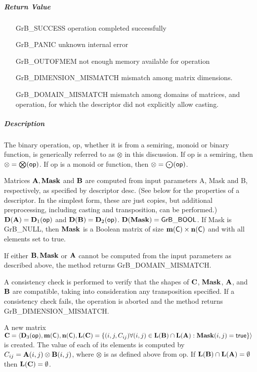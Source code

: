\subparagraph{Return Value}

\begin{itemize}[leftmargin=2.1in]
    \item[{\sf GrB\_SUCCESS}]             operation completed successfully
    \item[{\sf GrB\_PANIC}]               unknown internal error
    \item[{\sf GrB\_OUTOFMEM}]            not enough memory available for operation
    \item[{\sf GrB\_DIMENSION\_MISMATCH}] mismatch among matrix dimensions.
    \item[{\sf GrB\_DOMAIN\_MISMATCH}]    mismatch among domains of matrices, and operation, for which the descriptor did not explicitly allow casting.
\end{itemize}

\subparagraph{Description}

The binary operation, {\sf op}, whether it is from a semiring, monoid or binary function,
is generically referred to as $\otimes$ in this discussion.
If {\sf op} is a semiring, then $\otimes = \bigotimes({\sf op})$. 
If {\sf op} is a monoid or function, then $\otimes = \bigodot({\sf op})$.

Matrices ${\bf A}, {\bf Mask}$ and ${\bf B}$ are computed from
input parameters {\sf A}, {\sf Mask} and {\sf B}, respectively, as specified
by descriptor {\sf desc}. (See below for the properties of a descriptor. In
the simplest form, these are just copies, but additional preprocessing,
including casting and transposition, can be performed.)  $\bold{D}({\bf A}) =
\bold{D}_1({\sf op})$ and $\bold{D}({\bf B}) = \bold{D}_2({\sf op})$.
$\bold{D}({\bf Mask}) = {\sf GrB\_BOOL}$.  If {\sf Mask} is {\sf GrB\_NULL},
then ${\bf Mask}$ is a Boolean matrix of size $\bold{m}({\bf \sf C}) \times \bold{n}({\bf \sf C})$
and with all elements set to {\sf true}.

If either ${\bf B}, {\bf Mask}$ or ${\bf A}$ cannot be computed
from the input parameters as described above, the method returns {\sf
    GrB\_DOMAIN\_MISMATCH}.

A consistency check is performed to verify that the 
shapes of ${\bf C}$, ${\bf Mask}$, ${\bf A}$, and ${\bf B}$
are compatible, taking into consideration any transposition specified.
If a consistency
check fails, the operation is aborted and the method returns {\sf
    GrB\_DIMENSION\_MISMATCH}.

A new matrix ${\bf C} = \langle \bold{D}_3({\sf op}), \bold{m}({\bf \sf C}),
\bold{n}({\bf \sf C}), \bold{L}({\bf C}) = \{(i,j,C_{ij})  \forall (i,j) \in
\bold{L}({\bf B}) \cap \bold{L}({\bf A}) : {\bf Mask}(i,j)
= {\sf true} \} \rangle$ is created.  The value of each of its
elements is computed by $C_{ij} = {\bf A}(i,j) \otimes {\bf B}(i,j)$,
where $\otimes$ is as defined above from {\sf op}.
If $\bold{L}({\bf B}) \cap \bold{L}({\bf A}) = \emptyset$
then $\bold{L}({\bf C}) = \emptyset$.

